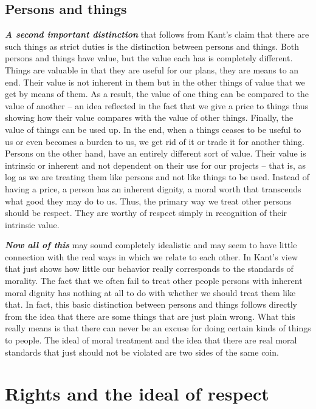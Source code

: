 \documentclass[12pt, openany]{book}
\begin{document}
\hypertarget{persons-and-things}{%
\subsection*{Persons and things}\label{persons-and-things}}


\textbf{\emph{A second important distinction}} that follows from Kant's claim that there are such things as strict duties is the distinction between persons and things. Both persons and things have value, but the value each has is completely different. Things are valuable in that they are useful for our plans, they are means to an end. Their value is not inherent in them but in the other things of value that we get by means of them. As a result, the value of one thing can be compared to the value of another -- an idea reflected in the fact that we give a price to things thus showing how their value compares with the value of other things. Finally, the value of things can be used up. In the end, when a things ceases to be useful to us or even becomes a burden to us, we get rid of it or trade it for another thing. Persons on the other hand, have an entirely different sort of value. Their value is intrinsic or inherent and not dependent on their use for our projects -- that is, as log as we are treating them like persons and not like things to be used. Instead of having a price, a person has an inherent dignity, a moral worth that transcends what good they may do to us. Thus, the primary way we treat other persons should be respect. They are worthy of respect simply in recognition of their intrinsic value.

\textbf{\emph{Now all of this}} may sound completely idealistic and may seem to have little connection with the real ways in which we relate to each other. In Kant's view that just shows how little our behavior really corresponds to the standards of morality. The fact that we often fail to treat other people persons with inherent moral dignity has nothing at all to do with whether we should treat them like that. In fact, this basic distinction between persons and things follows directly from the idea that there are some things that are just plain wrong. What this really means is that there can never be an excuse for doing certain kinds of things to people. The ideal of moral treatment and the idea that there are real moral standards that just should not be violated are two sides of the same coin.

\hypertarget{rights-and-the-ideal-of-respect}{%
\section{Rights and the ideal of respect}\label{rights-and-the-ideal-of-respect}}
\end{document}
